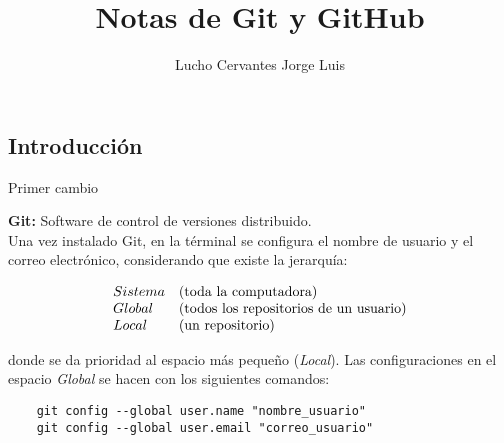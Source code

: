 \documentclass[10pt,oneside]{article}
\title{\textbf{Notas de Git y GitHub}}
\author{Lucho Cervantes Jorge Luis}
\begin{document}
\maketitle

\begin{multicols}{2}

    \section{Introducción}

    Primer cambio

    \textbf{Git:} Software de control de versiones distribuido. \\ \newline 
    Una vez instalado Git, en la términal se configura el nombre de usuario y el correo electrónico, considerando que existe la jerarquía: 
    
    $$\begin{array}{ll}
        Sistema& (\textnormal{toda la computadora})  \\
        Global& (\textnormal{todos los repositorios de un usuario})   \\
        Local& (\textnormal{un repositorio})
    \end{array}$$
    
    donde se da prioridad al espacio más pequeño (\textit{Local}). Las configuraciones en el espacio \textit{Global} se hacen con los siguientes comandos: 
    
\begin{verbatim}
    git config --global user.name "nombre_usuario"
    git config --global user.email "correo_usuario"
\end{verbatim}


\end{multicols}
\end{document}
